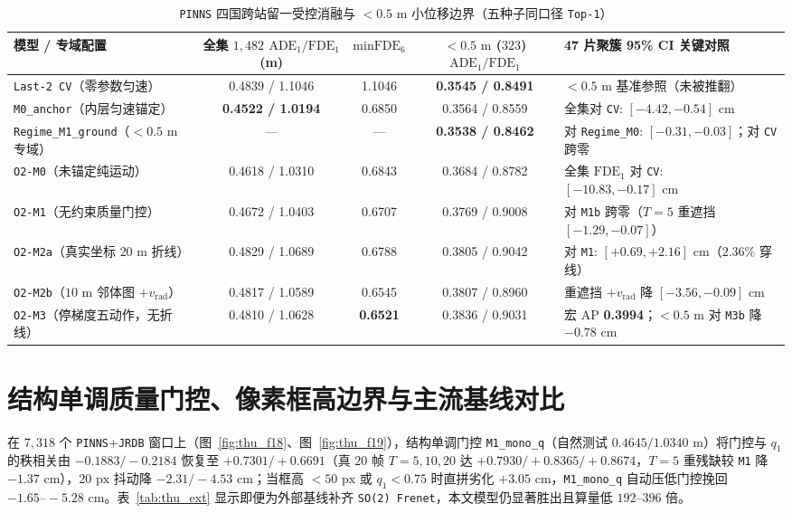 \documentclass[UTF8,a4paper,12pt,openany,oneside]{ctexrep}
\begin{document}
\begin{table}[!htbp]
\centering
\caption{\texttt{PINNS} 四国跨站留一受控消融与 $<0.5\text{ m}$ 小位移边界（五种子同口径 \texttt{Top-1}）}
\label{tab:thu_pinns}
\footnotesize
\begin{tabular}{lcccl}
\toprule
模型 / 专域配置 & 全集 $1{,}482$ $\text{ADE}_1/\text{FDE}_1$ (m) & $\text{minFDE}_6$ & $<0.5\text{ m}$ ($323$) $\text{ADE}_1/\text{FDE}_1$ & 47 片聚簇 95\% CI 关键对照 \\
\midrule
\texttt{Last-2 CV}（零参数匀速） & 0.4839 / 1.1046 & 1.1046 & \textbf{0.3545 / 0.8491} & $<0.5\text{ m}$ 基准参照（未被推翻） \\
\texttt{M0\_anchor}（内层匀速锚定） & \textbf{0.4522 / 1.0194} & 0.6850 & 0.3564 / 0.8559 & 全集对 \texttt{CV}: $[-4.42, -0.54]\text{ cm}$ \\
\texttt{Regime\_M1\_ground}（$<0.5\text{ m}$ 专域） & --- & --- & \textbf{0.3538 / 0.8462} & 对 \texttt{Regime\_M0}: $[-0.31, -0.03]$；对 \texttt{CV} 跨零 \\
\texttt{O2-M0}（未锚定纯运动） & 0.4618 / 1.0310 & 0.6843 & 0.3684 / 0.8782 & 全集 $\text{FDE}_1$ 对 \texttt{CV}: $[-10.83, -0.17]\text{ cm}$ \\
\texttt{O2-M1}（无约束质量门控） & 0.4672 / 1.0403 & 0.6707 & 0.3769 / 0.9008 & 对 \texttt{M1b} 跨零（$T=5$ 重遮挡 $[-1.29, -0.07]$） \\
\texttt{O2-M2a}（真实坐标 $20\text{ m}$ 折线） & 0.4829 / 1.0689 & 0.6788 & 0.3805 / 0.9042 & 对 \texttt{M1}: $[+0.69, +2.16]\text{ cm}$（$2.36\%$ 穿线） \\
\texttt{O2-M2b}（$10\text{ m}$ 邻体图 $+v_{\text{rad}}$） & 0.4817 / 1.0589 & 0.6545 & 0.3807 / 0.8960 & 重遮挡 $+v_{\text{rad}}$ 降 $[-3.56, -0.09]\text{ cm}$ \\
\texttt{O2-M3}（停梯度五动作，无折线） & 0.4810 / 1.0628 & \textbf{0.6521} & 0.3836 / 0.9031 & 宏 AP \textbf{0.3994}；$<0.5\text{ m}$ 对 \texttt{M3b} 降 $-0.78\text{ cm}$ \\
\bottomrule
\end{tabular}
\end{table}

\section{结构单调质量门控、像素框高边界与主流基线对比}
在 $7{,}318$ 个 \texttt{PINNS}+\texttt{JRDB} 窗口上（图~\ref{fig:thu_f18}、图~\ref{fig:thu_f19}），结构单调门控 \texttt{M1\_mono\_q}（自然测试 $0.4645 / 1.0340\text{ m}$）将门控与 $q_1$ 的秩相关由 $-0.1883 / -0.2184$ 恢复至 $+0.7301 / +0.6691$（真 $20$ 帧 $T=5,10,20$ 达 $+0.7930 / +0.8365 / +0.8674$，$T=5$ 重残缺较 \texttt{M1} 降 $-1.37\text{ cm}$），$20\text{ px}$ 抖动降 $-2.31 / -4.53\text{ cm}$；当框高 $<50\text{ px}$ 或 $q_1 < 0.75$ 时直拼劣化 $+3.05\text{ cm}$，\texttt{M1\_mono\_q} 自动压低门控挽回 $-1.65\text{--}-5.28\text{ cm}$。表~\ref{tab:thu_ext} 显示即便为外部基线补齐 \texttt{SO(2) Frenet}，本文模型仍显著胜出且算量低 $192\text{--}396$ 倍。
\end{document}
